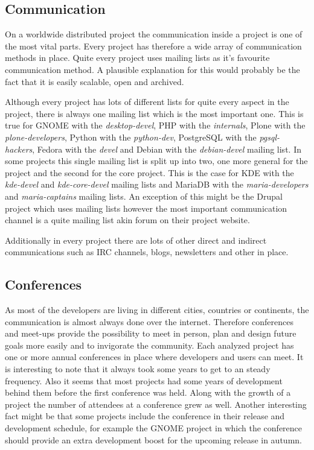 
\subsection{Communication} %

On a worldwide distributed project the communication inside a project is one of
the most vital parts. Every project has therefore a wide array of communication
methods in place. Quite every project uses mailing lists as it's favourite
communication method. A plausible explanation for this would probably be the
fact that it is easily scalable, open and archived.

Although every project has lots of different lists for quite every aspect in
the project, there is always one mailing list which is the most important one.
This is true for GNOME with the \emph{desktop-devel}, PHP with the
\emph{internals}, Plone with the \emph{plone-developers}, Python with the
\emph{python-dev}, PostgreSQL with the \emph{pgsql-hackers}, Fedora with the
\emph{devel} and Debian with the \emph{debian-devel} mailing list. In some
projects this single mailing list is split up into two, one more general for
the project and the second for the core project. This is the case for KDE with
the \emph{kde-devel} and \emph{kde-core-devel} mailing lists and MariaDB with
the \emph{maria-developers} and \emph{maria-captains} mailing lists. An
exception of this might be the Drupal project which uses mailing lists however
the most important communication channel is a quite mailing list akin forum on
their project website.

Additionally in every project there are lots of other direct and indirect
communications such as \ac{IRC} channels, blogs, newsletters and other in
place.


\subsection{Conferences} %

As most of the developers are living in different cities, countries or
continents, the communication is almost always done over the internet.
Therefore conferences and meet-ups provide the possibility to meet in person,
plan and design future goals more easily and to invigorate the community. Each
analyzed project has one or more annual conferences in place where developers
and users can meet. It is interesting to note that it always took some years to
get to an steady frequency. Also it seems that most projects had some years of
development behind them before the first conference was held. Along with the
growth of a project the number of attendees at a conference grew as well.
Another interesting fact might be that some projects include the conference in
their release and development schedule, for example the GNOME project in which
the conference should provide an extra development boost for the upcoming
release in autumn.

